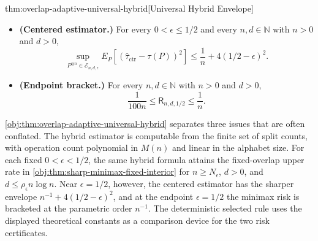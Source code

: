 \begin{theoremv}{thm:overlap-adaptive-universal-hybrid}[Universal Hybrid Envelope]
\begin{itemize}
\item \textbf{(Centered estimator.)} For every \(0<\epsilon\le 1/2\) and every \(n,d\in\mathbb N\) with \(n>0\) and \(d>0\),
\[
\sup_{P^{\otimes n}\in\mathcal E_{n,d,\epsilon}}
E_P\!\left[(\widehat\tau_{\mathrm{ctr}}-\tau(P))^2\right]
\le
\frac1n+4(1/2-\epsilon)^2 .
\]

\item \textbf{(Endpoint bracket.)} For every \(n,d\in\mathbb N\) with \(n>0\) and \(d>0\),
\[
\frac{1}{100n}\le \mathsf R_{n,d,1/2}\le \frac1n .
\]
\end{itemize}
\end{theoremv}

\cref{obj:thm:overlap-adaptive-universal-hybrid} separates three issues that are often conflated. The hybrid estimator is computable from the finite set of split counts, with operation count polynomial in \(M(n)\) and linear in the alphabet size. For each fixed \(0<\epsilon<1/2\), the same hybrid formula attains the fixed-overlap upper rate in \cref{obj:thm:sharp-minimax-fixed-interior} for \(n\ge N_\epsilon\), \(d>0\), and \(d\le\rho_\epsilon n\log n\). Near \(\epsilon=1/2\), however, the centered estimator has the sharper envelope \(n^{-1}+4(1/2-\epsilon)^2\), and at the endpoint \(\epsilon=1/2\) the minimax risk is bracketed at the parametric order \(n^{-1}\). The deterministic selected rule uses the displayed theoretical constants as a comparison device for the two risk certificates.
